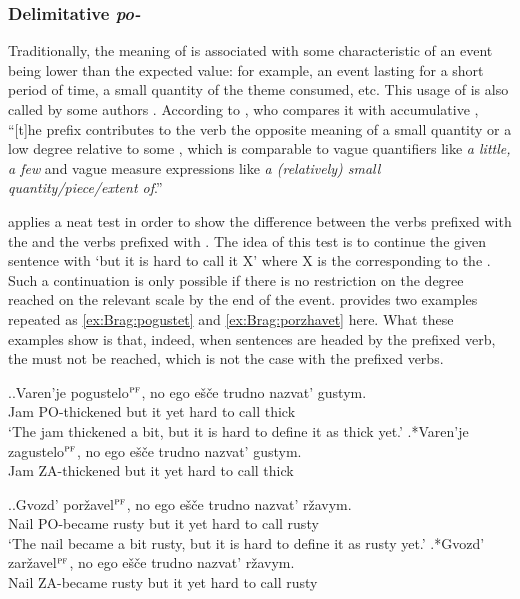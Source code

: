 \subsubsection{Delimitative \textit{po-}}
Traditionally, the  meaning of  is associated with some characteristic of an event being lower than the expected value: for example, an event lasting for a short period of time, a small quantity of the theme consumed, etc. This usage of  is also called  by some authors \citep[e.g.][]{Svenonius:04b}. According to \citet[47--48]{Filip:00}, who compares it with accumulative , ``[t]he prefix  contributes to the verb the opposite meaning of a small quantity or a low degree relative to some , which is comparable to vague quantifiers like \textit{a little, a few} and vague measure expressions like \textit{a (relatively) small quantity\slash piece\slash extent of}.''

\citet[183]{Braginsky:08} applies a neat test in order to show the difference between the verbs prefixed with the   and the verbs prefixed with . The idea of this test is to continue the given sentence with `but it is hard to call it X' where X is the  corresponding to the . Such a continuation is only possible if there is no restriction on the degree reached on the relevant scale by the end of the event. \citet[183]{Braginsky:08} provides two examples repeated as \ref{ex:Brag:pogustet} and \ref{ex:Brag:porzhavet} here. What these examples show is that, indeed, when sentences are headed by the prefixed verb, the  must not be reached, which is not the case with the prefixed  verbs.

\ex.\label{ex:Brag:pogustet}\ag.Varen'je pogustelo$^{\textsc{pf}}$, no ego e\v{s}\v{c}e trudno nazvat' gustym.\\
Jam PO-thickened but it yet hard {to call} thick\\
\trans `The jam thickened a bit, but it is hard to define it as thick yet.'
\bg.*Varen'je zagustelo$^{\textsc{pf}}$, no ego e\v{s}\v{c}e trudno nazvat' gustym.\\
Jam ZA-thickened but it yet hard {to call} thick\\

\ex.\label{ex:Brag:porzhavet}\ag.Gvozd' por\v{z}avel$^{\textsc{pf}}$, no ego e\v{s}\v{c}e trudno nazvat' r\v{z}avym.\\
Nail {PO-became rusty} but it yet hard {to call} rusty\\
\trans `The nail became a bit rusty, but it is hard to define it as rusty yet.'
\bg.*Gvozd' zar\v{z}avel$^{\textsc{pf}}$, no ego e\v{s}\v{c}e trudno nazvat' r\v{z}avym.\\
Nail {ZA-became rusty} but it yet hard {to call} rusty\\

